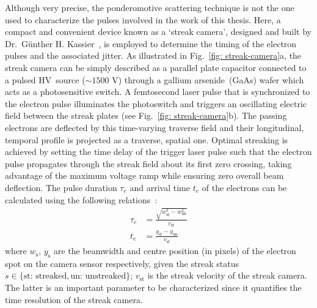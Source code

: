Although very precise, the ponderomotive scattering technique is not the one used to
characterize the pulses involved in the work of this thesis.
Here, a compact and convenient device known as a `streak camera',
designed and built by Dr.~G\"{u}nther H. Kassier~\cite{Kassier2010},
is employed to determine the timing of the electron pulses and the associated jitter.
As illustrated in Fig.~\ref{fig: streak-camera}a,
the streak camera can be simply described as a parallel plate capacitor connected
to a pulsed HV~source (${\sim}1500$ V) through a gallium arsenide~(GaAs) wafer
which acts as a photosensitive switch.
A femtosecond laser pulse that is synchronized to the electron pulse illuminates the photoswitch and
triggers an oscillating electric field between the streak plates (see Fig.~\ref{fig: streak-camera}b).
The passing electrons are deflected by this time-varying traverse field and their
longitudinal, temporal profile is projected as a traverse, spatial one.
Optimal streaking is achieved by setting the time delay of the trigger laser pulse such that
the electron pulse propagates through the streak field about its first zero crossing,
taking advantage of the maximum voltage ramp while ensuring zero overall beam deflection.
The pulse duration $\tau_e$ and arrival time $t_e$ of the electrons can be calculated using
the following relations~\cite{Wang2009}:
%
\begin{equation}
\begin{aligned}
    \tau_e & = \frac{\sqrt{ w_\textrm{st}^2 - w_\textrm{un}^2 }}{v_\textrm{st}} \\
    t_e & = \frac{y_\textrm{st} - y_\textrm{un}}{v_\textrm{st}}
\end{aligned}
\end{equation}
%
where $w_\textrm{s}$, $y_\textrm{s}$ are the beamwidth and centre position (in pixels)
of the electron spot on the camera sensor respectively,
given the streak status $s \in \{ \textrm{st: streaked}, \textrm{un: unstreaked} \}$;
$v_\textrm{st}$ is the streak velocity of the streak camera.
The latter is an important parameter to be characterized since it quantifies the time resolution
of the streak camera.
%
